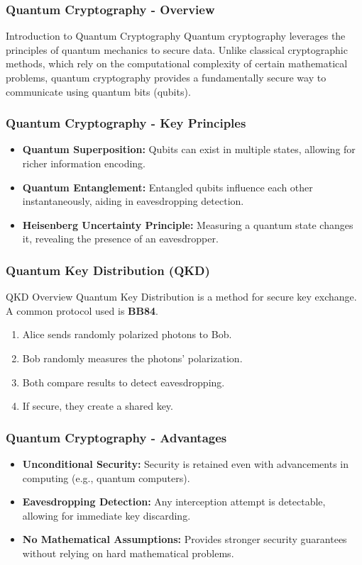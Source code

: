 \documentclass{beamer}
\begin{document}
\begin{frame}[fragile]
    \frametitle{Quantum Cryptography - Overview}
    \begin{block}{Introduction to Quantum Cryptography}
        Quantum cryptography leverages the principles of quantum mechanics to secure data. 
        Unlike classical cryptographic methods, which rely on the computational complexity 
        of certain mathematical problems, quantum cryptography provides a fundamentally secure 
        way to communicate using quantum bits (qubits).
    \end{block}
\end{frame}

\begin{frame}[fragile]
    \frametitle{Quantum Cryptography - Key Principles}
    \begin{itemize}
        \item \textbf{Quantum Superposition:} Qubits can exist in multiple states, allowing for richer information encoding.
        \item \textbf{Quantum Entanglement:} Entangled qubits influence each other instantaneously, aiding in eavesdropping detection.
        \item \textbf{Heisenberg Uncertainty Principle:} Measuring a quantum state changes it, revealing the presence of an eavesdropper.
    \end{itemize}
\end{frame}

\begin{frame}[fragile]
    \frametitle{Quantum Key Distribution (QKD)}
    \begin{block}{QKD Overview}
        Quantum Key Distribution is a method for secure key exchange. A common protocol used is \textbf{BB84}.
    \end{block}
    \begin{enumerate}
        \item Alice sends randomly polarized photons to Bob.
        \item Bob randomly measures the photons' polarization.
        \item Both compare results to detect eavesdropping.
        \item If secure, they create a shared key.
    \end{enumerate}
\end{frame}

\begin{frame}[fragile]
    \frametitle{Quantum Cryptography - Advantages}
    \begin{itemize}
        \item \textbf{Unconditional Security:} Security is retained even with advancements in computing (e.g., quantum computers).
        \item \textbf{Eavesdropping Detection:} Any interception attempt is detectable, allowing for immediate key discarding.
        \item \textbf{No Mathematical Assumptions:} Provides stronger security guarantees without relying on hard mathematical problems.
    \end{itemize}
\end{frame}
\end{document}
